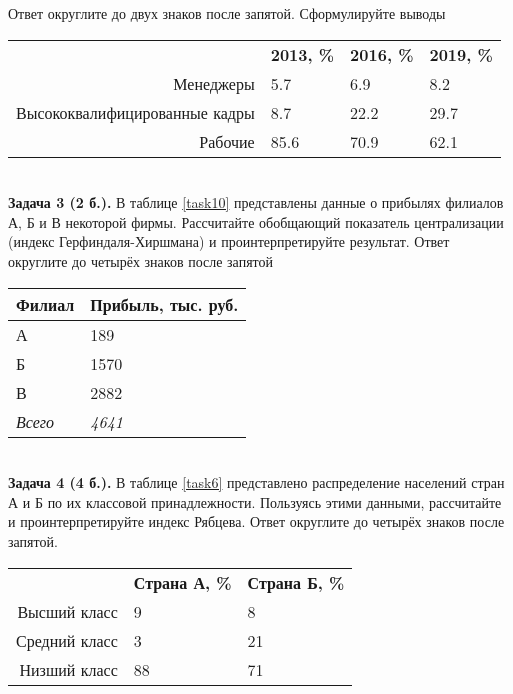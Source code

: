 \documentclass{article}
\begin{document}
Ответ округлите до двух знаков после запятой. Сформулируйте выводы\\

\begin{minipage}{\textwidth}
\centering
\begin{tabularx}{0.8\textwidth}{rYYY}
\toprule
 & \textbf{2013, \%} & \textbf{2016, \%} & \textbf{2019, \%} \\
\cmidrule(lr){2-2}\cmidrule(lr){3-3}\cmidrule(lr){4-4}
Менеджеры & 5.7 & 6.9 & 8.2 \\

Высококвалифицированные кадры & 8.7 & 22.2 & 29.7 \\

Рабочие & 85.6 & 70.9 & 62.1 \\
\bottomrule
\end{tabularx}
\label{task3}
\end{minipage} \\[35pt]

\textbf{Задача 3 (2 б.).} В таблице \ref{task10} представлены данные о прибылях филиалов А, Б и В некоторой фирмы. Рассчитайте обобщающий показатель централизации (индекс Герфиндаля-Хиршмана) и проинтерпретируйте результат. Ответ округлите до четырёх знаков после запятой\\

\begin{minipage}{\textwidth}
\centering
\begin{tabularx}{0.4\textwidth}{YY}
\toprule
\textbf{Филиал} & \textbf{Прибыль, тыс. руб.} \\
\midrule
А & 189 \\

Б & 1570 \\

В & 2882 \\
\addlinespace
\textit{Всего} & \textit{4641} \\
\bottomrule
\end{tabularx}
\label{task10}
\end{minipage} \\[35pt]

\textbf{Задача 4 (4 б.).} В таблице \ref{task6} представлено распределение населений стран А и Б по их классовой принадлежности. Пользуясь этими данными, рассчитайте и проинтерпретируйте индекс Рябцева. Ответ округлите до четырёх знаков после запятой.\\

\begin{minipage}{\textwidth}
\centering
\begin{tabularx}{0.7\textwidth}{rYY}
\toprule
 & \textbf{Страна А, \%} & \textbf{Страна Б, \%} \\
\cmidrule(lr){2-2}\cmidrule(lr){3-3}
Высший класс & 9 & 8 \\

Средний класс & 3 & 21 \\

Низший класс & 88 & 71 \\
\bottomrule
\end{tabularx}
\label{task6}
\end{minipage} \\[35pt]
\end{document}
